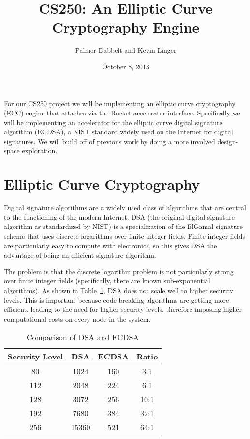 \documentclass[twocolumn]{article}
\title{CS250: An Elliptic Curve Cryptography Engine}
\author{Palmer Dabbelt and Kevin Linger}
\date{October 8, 2013}
\begin{document}
\maketitle

For our CS250 project we will be implementing an elliptic curve
cryptography (ECC) engine that attaches via the Rocket accelerator
interface.  Specifically we will be implementing an accelerator for
the elliptic curve digital signature algorithm (ECDSA), a NIST
standard widely used on the Internet for digital signatures. We will
build off of previous work by doing a more involved design-space
exploration. 

\section{Elliptic Curve Cryptography}

Digital signature algorithms\cite{fips-186-3} are a widely used class
of algorithms that are central to the functioning of the modern
Internet.  DSA\cite{us-dsa} (the original digital signature algorithm
as standardized by NIST) is a specialization of the ElGamal signature
scheme\cite{elgamal-sig} that uses discrete logarithms over finite
integer fields.  Finite integer fields are particularly easy to
compute with electronics, so this gives DSA the advantage of being an
efficient signature algorithm.

The problem is that the discrete logarithm problem is not particularly
strong over finite integer fields (specifically, there are known
sub-exponential algorithms\cite{adleman-subexp}).  As shown in
Table~\ref{key-sizes}, DSA does not scale well to higher security
levels.  This is important because code breaking algorithms are
getting more efficient, leading to the need for higher security
levels, therefore imposing higher computational costs on every node in
the system. 

\begin{table}[h]
  \begin{center}
    \begin{tabular}{cccc}
      Security Level & DSA & ECDSA & Ratio \\
      \hline
      80 & 1024 & 160 & 3:1 \\
      112 & 2048 & 224 & 6:1 \\
      128 & 3072 & 256 & 10:1 \\
      192 & 7680 & 384 & 32:1 \\
      256 & 15360 & 521 & 64:1 \\
    \end{tabular}
  \end{center}

  \caption{Comparison of DSA and ECDSA\cite{nsa-case_for_ecc}
    \label{key-sizes}}
\end{table}
\end{document}
